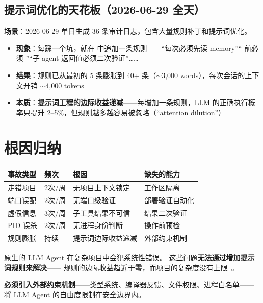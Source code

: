 \documentclass[10pt, openany]{book}
\begin{document}
\subsection{提示词优化的天花板（2026-06-29 全天）}

\textbf{场景}：2026-06-29 单日生成 36 条审计日志，包含大量规则补丁和提示词优化。

\begin{itemize}
    \item \textbf{现象}：每踩一个坑，就在  中追加一条规则——``每次必须先读 memory''`` 前必须 ''``子 agent 返回值必须二次验证''……
    \item \textbf{结果}：规则已从最初的 5 条膨胀到 40+ 条（\(\sim\)3,000 words），每次会话的上下文开销 \(\sim\)4,000 tokens
    \item \textbf{本质}：\textbf{提示词工程的边际收益递减}——每增加一条规则，LLM 的正确执行概率只提升 2--5\%，但规则越多越容易被忽略（``attention dilution''）~\cite{Liu2023LostInMiddle}
\end{itemize}

\section{根因归纳}

\begin{table}[h]
\centering
\begin{tabular}{p{2.5cm} p{2cm} p{4.5cm} p{3cm}}
\toprule
\textbf{事故类型} & \textbf{频次} & \textbf{根因} & \textbf{缺失的能力} \\
\midrule
走错项目 & 2次/周 & 无项目上下文锁定 & 工作区隔离 \\
端口误配 & 2次/周 & 无端口级验证 & 部署验证自动化 \\
虚假信息 & 3次/周 & 子工具结果不可信 & 结果二次验证 \\
PID 误杀 & 2次/周 & 无进程身份判断 & 操作前预检 \\
规则膨胀 & 持续 & 提示词边际收益递减 & 外部约束机制 \\
\bottomrule
\end{tabular}
\end{table}

\begin{principle}[复盘结论]
原生的 LLM Agent 在复杂项目中会犯系统性错误。
这些问题\textbf{无法通过增加提示词规则来解决}——
规则的边际收益趋近于零，而项目的复杂度没有上限~\cite{Liu2023LostInMiddle}。

\textbf{必须引入外部约束机制}——类型系统、编译器反馈、文件权限、进程白名单——
将 LLM Agent 的自由度限制在安全边界内。
\end{principle}
\end{document}

